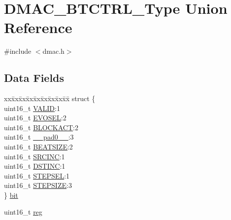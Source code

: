 \hypertarget{union_d_m_a_c___b_t_c_t_r_l___type}{}\section{D\+M\+A\+C\+\_\+\+B\+T\+C\+T\+R\+L\+\_\+\+Type Union Reference}
\label{union_d_m_a_c___b_t_c_t_r_l___type}


{\ttfamily \#include $<$dmac.\+h$>$}

\subsection*{Data Fields}
\begin{DoxyCompactItemize}
\item 
\begin{tabbing}
xx\=xx\=xx\=xx\=xx\=xx\=xx\=xx\=xx\=\kill
struct \{\\
\>uint16\_t \mbox{\hyperlink{union_d_m_a_c___b_t_c_t_r_l___type_a51f4f09f6db78bb23c72d61d0aa6637a}{VALID}}:1\\
\>uint16\_t \mbox{\hyperlink{union_d_m_a_c___b_t_c_t_r_l___type_a38a0180e33174e537ae98a82a0553e00}{EVOSEL}}:2\\
\>uint16\_t \mbox{\hyperlink{union_d_m_a_c___b_t_c_t_r_l___type_a03c40d727a3c2faad7167d9c044d0966}{BLOCKACT}}:2\\
\>uint16\_t \mbox{\hyperlink{union_d_m_a_c___b_t_c_t_r_l___type_a77132c2c26a75f5b8751b235cda23828}{\_\_pad0\_\_}}:3\\
\>uint16\_t \mbox{\hyperlink{union_d_m_a_c___b_t_c_t_r_l___type_a6ba3431665137c6c6857bf33fe9f1da6}{BEATSIZE}}:2\\
\>uint16\_t \mbox{\hyperlink{union_d_m_a_c___b_t_c_t_r_l___type_a29a462d815f4cc36c8a8c9ad33ee384c}{SRCINC}}:1\\
\>uint16\_t \mbox{\hyperlink{union_d_m_a_c___b_t_c_t_r_l___type_a44139849c76f2a9118d8ece52ae1b0f1}{DSTINC}}:1\\
\>uint16\_t \mbox{\hyperlink{union_d_m_a_c___b_t_c_t_r_l___type_a7f01b7ff859f83e61d5f6ee4f4d14eff}{STEPSEL}}:1\\
\>uint16\_t \mbox{\hyperlink{union_d_m_a_c___b_t_c_t_r_l___type_a858501bd676af9d6546b02dde52f90a8}{STEPSIZE}}:3\\
\} \mbox{\hyperlink{union_d_m_a_c___b_t_c_t_r_l___type_a4830684a8d8bed4d3a84809e6e1f265c}{bit}}\\

\end{tabbing}\item 
uint16\+\_\+t \mbox{\hyperlink{union_d_m_a_c___b_t_c_t_r_l___type_a11760f5020019f4aa8cb02e694f7cc44}{reg}}
\end{DoxyCompactItemize}


